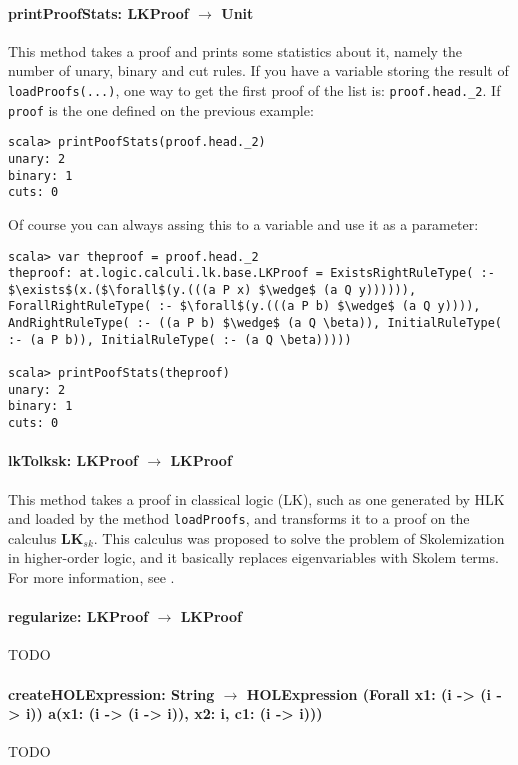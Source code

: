 \documentclass[a4paper, 11pt]{report}
\begin{document}
\paragraph{\textbf{printProofStats: LKProof $\rightarrow$ Unit}}
This method takes a proof and prints some statistics about it, namely the number
of unary, binary and cut rules. If you have a variable storing the result of 
\texttt{loadProofs(...)}, one way to get the first proof of the list is: 
\texttt{proof.head.\_2}. If \texttt{proof} is the one defined on the previous 
example:

\begin{lstlisting}
scala> printPoofStats(proof.head._2)
unary: 2
binary: 1
cuts: 0
\end{lstlisting}

Of course you can always assing this to a variable and use it as a parameter:

\begin{lstlisting}
scala> var theproof = proof.head._2
theproof: at.logic.calculi.lk.base.LKProof = ExistsRightRuleType( :- $\exists$(x.($\forall$(y.(((a P x) $\wedge$ (a Q y)))))), ForallRightRuleType( :- $\forall$(y.(((a P b) $\wedge$ (a Q y)))), AndRightRuleType( :- ((a P b) $\wedge$ (a Q \beta)), InitialRuleType( :- (a P b)), InitialRuleType( :- (a Q \beta)))))

scala> printPoofStats(theproof)
unary: 2
binary: 1
cuts: 0
\end{lstlisting}

\paragraph{\textbf{lkTolksk: LKProof $\rightarrow$ LKProof}}
This method takes a proof in classical logic (LK), such as one generated by HLK and 
loaded by the method \texttt{loadProofs}, and transforms it to a proof on the
calculus $\mathbf{LK}_{sk}$. This calculus was proposed to solve the problem of
Skolemization in higher-order logic, and it basically replaces eigenvariables
with Skolem terms. For more information, see \cite{Hetzl2011}.

\paragraph{\textbf{regularize: LKProof $\rightarrow$ LKProof}}
{\color{red}TODO}

\paragraph{\textbf{createHOLExpression: String $\rightarrow$ HOLExpression
(Forall x1: (i -> (i -> i)) a(x1: (i -> (i -> i)), x2: i, c1: (i -> i)))}}
{\color{red}TODO}
\end{document}
